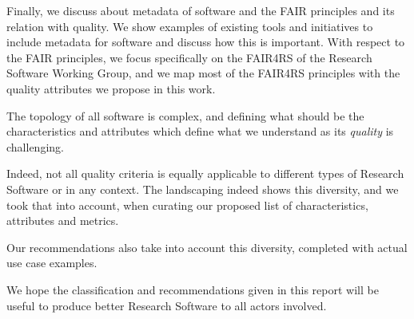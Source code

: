 Finally, we discuss about metadata of software and the FAIR principles and its relation with quality. We show examples of existing tools and initiatives to include metadata for software and discuss how this is important. With respect to the FAIR principles, we focus specifically on the FAIR4RS of the Research Software Working Group, and we map most of the FAIR4RS principles with the quality attributes we propose in this work.

The topology of all software is complex, and defining what should be the characteristics and attributes which define what we understand as its \textit{quality} is challenging.

Indeed, not all quality criteria is equally applicable to different types of Research Software or in any context. The landscaping indeed shows this diversity, and we took that into account, when curating our proposed list of characteristics, attributes and metrics. 

Our recommendations also take into account this diversity, completed with actual use case examples.

We hope the classification and recommendations given in this report will be useful to produce better Research Software to all actors involved.
